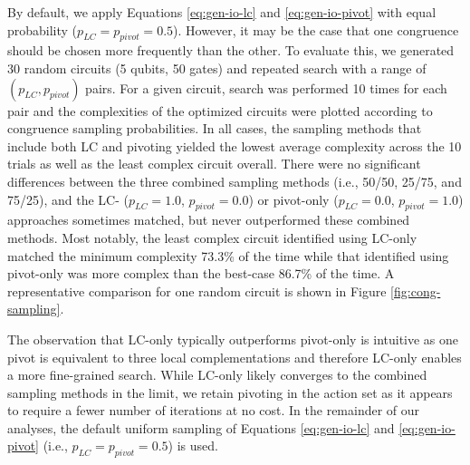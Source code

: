 By default, we apply Equations \ref{eq:gen-io-lc} and \ref{eq:gen-io-pivot} with equal probability ($p_{LC} = p_{pivot} = 0.5$).
However, it may be the case that one congruence should be chosen more frequently than the other.
To evaluate this, we generated 30 random circuits (5 qubits, 50 gates) and repeated search with a range of $(p_{LC}, p_{pivot})$ pairs.
For a given circuit, search was performed 10 times for each pair and the complexities of the optimized circuits were plotted according to congruence sampling probabilities.
In all cases, the sampling methods that include both LC and pivoting yielded the lowest average complexity across the 10 trials as well as the least complex circuit overall.
There were no significant differences between the three combined sampling methods (i.e., 50/50, 25/75, and 75/25), and the LC- ($p_{LC} = 1.0$, $p_{pivot} = 0.0$) or pivot-only ($p_{LC} = 0.0$, $p_{pivot} = 1.0$) approaches sometimes matched, but never outperformed these combined methods.
Most notably, the least complex circuit identified using LC-only matched the minimum complexity 73.3\% of the time while that identified using pivot-only was more complex than the best-case 86.7\% of the time.
A representative comparison for one random circuit is shown in Figure \ref{fig:cong-sampling}.

The observation that LC-only typically outperforms pivot-only is intuitive as one pivot is equivalent to three local complementations and therefore LC-only enables a more fine-grained search.
While LC-only likely converges to the combined sampling methods in the limit, we retain pivoting in the action set as it appears to require a fewer number of iterations at no cost.
In the remainder of our analyses, the default uniform sampling of Equations \ref{eq:gen-io-lc} and \ref{eq:gen-io-pivot} (i.e., $p_{LC} = p_{pivot} = 0.5$) is used.


